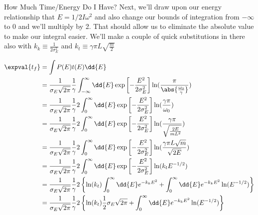 \begin{answer}
\begin{answerpart}{How Much Time/Energy Do I Have?}
    Next, we'll draw upon our energy relationship that $E = 1/2 I
    \omega^2$ and also change our bounds of integration from $-\infty$
    to $0$ and we'll multiply by 2.  That should allow us to eliminate
    the absolute value to make our integral easier.  We'll make a
    couple of quick substitutions in there also with $k_k \equiv
    \frac{1}{2\sigma_E^2}$ and $k_t \equiv \gamma \pi L
    \sqrt{\frac{m}{2}}$

    \begin{equation}
      \begin{alignedat}{2}
        &&\expval{t_f}
        &= \int P(E)t(E) \dd{E}\\
        &&&=
        \frac{1}{\sigma_E\sqrt{2\pi}}
        \frac{1}{\gamma}
        \int_{-\infty}^{\infty}
        \dd{E}
        \exp\left[-\frac{E^2}{2\sigma_E^2}\right]
        \ln(\frac{\pi}{\abs{\frac{\omega_0}{\gamma}}})
        \\
        &&&=
        \frac{1}{\sigma_E\sqrt{2\pi}}
        \frac{1}{\gamma}
        2
        \int_{0}^{\infty}
        \dd{E}
        \exp\left[-\frac{E^2}{2\sigma_E^2}\right]
        \ln(\frac{\gamma\pi}{\omega_0})
        \\
        &&&=
        \frac{1}{\sigma_E\sqrt{2\pi}}
        \frac{1}{\gamma}
        2
        \int_{0}^{\infty}
        \dd{E}
        \exp\left[-\frac{E^2}{2\sigma_E^2}\right]
        \ln(\frac{\gamma\pi}{\sqrt{\frac{2E}{mL^2}}})
        \\
        &&&=
        \frac{1}{\sigma_E\sqrt{2\pi}}
        \frac{1}{\gamma}
        2
        \int_{0}^{\infty}
        \dd{E}
        \exp\left[-\frac{E^2}{2\sigma_E^2}\right]
        \ln(\frac{\gamma \pi L \sqrt{m}}{\sqrt{2E}})
        \\
        &&&=
        \frac{1}{\sigma_E\sqrt{2\pi}}
        \frac{1}{\gamma}
        2
        \int_{0}^{\infty}
        \dd{E}
        \exp\left[-\frac{E^2}{2\sigma_E^2}\right]
        \ln(k_tE^{-1/2})
        \\
        &&&=
        \frac{1}{\sigma_E\sqrt{2\pi}}
        \frac{1}{\gamma}
        2
        \left\{
        \ln(k_t)
        \int_{0}^{\infty}
        \dd{E}
        e^{-k_kE^2}
        +
        \int_{0}^{\infty}
        \dd{E}
        e^{-k_kE^2}
        \ln(E^{-1/2})
        \right\}
        \\
        &&&=
        \frac{1}{\sigma_E\sqrt{2\pi}}
        \frac{1}{\gamma}
        2
        \left\{
        \ln(k_t)
        \frac{1}{2}\sigma_E\sqrt{2\pi}
        +
        \int_{0}^{\infty}
        \dd{E}
        e^{-k_kE^2}
        \ln(E^{-1/2})
        \right\}
        \\
      \end{alignedat}
    \end{equation}


\end{answerpart}
\end{answer}
